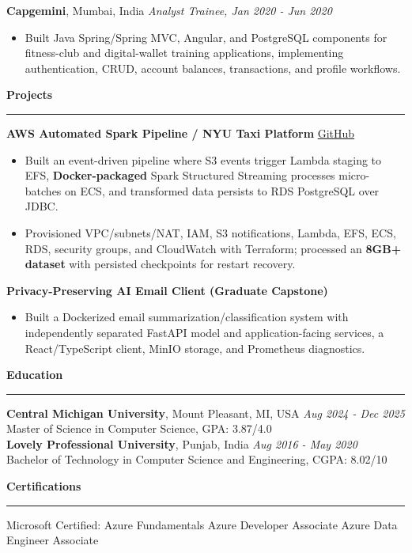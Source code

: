 \documentclass[11pt,letterpaper]{article}
\newcommand{\ressection}[1]{\Needspace{6\baselineskip}\vspace{8pt}\par\textbf{#1}\par\vspace{2pt}\hrule\vspace{5pt}}
\begin{document}
\textbf{Capgemini}, Mumbai, India \hfill \textit{Analyst Trainee, Jan 2020 - Jun 2020}
\begin{itemize}
  \item Built Java Spring/Spring MVC, Angular, and PostgreSQL components for fitness-club and digital-wallet training applications, implementing authentication, CRUD, account balances, transactions, and profile workflows.
\end{itemize}

\ressection{Projects}
\textbf{AWS Automated Spark Pipeline / NYU Taxi Platform} \hfill \href{https://github.com/preferablehuman/AWS-automated-spark-pipeline}{GitHub}
\begin{itemize}
  \item Built an event-driven pipeline where S3 events trigger Lambda staging to EFS, \textbf{Docker-packaged} Spark Structured Streaming processes micro-batches on ECS, and transformed data persists to RDS PostgreSQL over JDBC.
  \item Provisioned VPC/subnets/NAT, IAM, S3 notifications, Lambda, EFS, ECS, RDS, security groups, and CloudWatch with Terraform; processed an \textbf{8GB+ dataset} with persisted checkpoints for restart recovery.
\end{itemize}
\vspace{2pt}
\textbf{Privacy-Preserving AI Email Client (Graduate Capstone)}
\begin{itemize}
  \item Built a Dockerized email summarization/classification system with independently separated FastAPI model and application-facing services, a React/TypeScript client, MinIO storage, and Prometheus diagnostics.
\end{itemize}

\ressection{Education}
\textbf{Central Michigan University}, Mount Pleasant, MI, USA \hfill \textit{Aug 2024 - Dec 2025}\\
Master of Science in Computer Science, GPA: 3.87/4.0\\
\textbf{Lovely Professional University}, Punjab, India \hfill \textit{Aug 2016 - May 2020}\\
Bachelor of Technology in Computer Science and Engineering, CGPA: 8.02/10

\ressection{Certifications}
Microsoft Certified: Azure Fundamentals \textbar{} Azure Developer Associate \textbar{} Azure Data Engineer Associate
\end{document}
